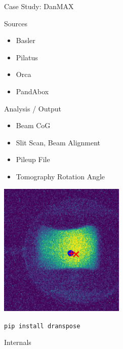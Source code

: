 \documentclass[aspectratio=169]{beamer}
\begin{document}
\begin{frame}{Case Study: DanMAX}
\begin{minipage}{0.5\textwidth}
  \begin{block}{Sources}
   \begin{itemize}
    \item Basler
    \item Pilatus
    \item Orca
    \item PandAbox
   \end{itemize}
  \end{block}

  \begin{block}{Analysis / Output}
   \begin{itemize}
    \item Beam CoG
    \item Slit Scan, Beam Alignment
    \item Pileup File
    \item Tomography Rotation Angle
   \end{itemize}
  \end{block}

\end{minipage}
\begin{minipage}{0.49\textwidth}
\includegraphics[width=6cm]{img/beamcog}
\end{minipage}

\end{frame}


\begin{frame}
 \centering
 \Huge {} \texttt{pip install dranspose}
\end{frame}


\appendix

\begin{frame}
 \centering
 \Huge {} Internals
\end{frame}
\end{document}
